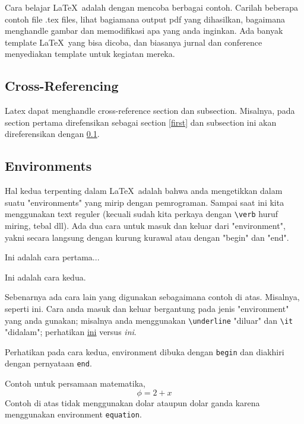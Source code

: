 \documentclass[12pt]{article}
\begin{document}
Cara belajar \LaTeX\ adalah dengan mencoba berbagai contoh. Carilah beberapa contoh file .tex files, lihat bagiamana output pdf yang dihasilkan, bagaimana menghandle gambar dan memodifikasi apa yang anda inginkan. Ada banyak template \LaTeX\ yang bisa dicoba, dan biasanya jurnal dan conference menyediakan template untuk kegiatan mereka.


\subsection{Cross-Referencing}
\label{subref}

Latex dapat menghandle cross-reference section dan subsection. Misalnya, pada section pertama direfensikan sebagai section \ref{first} dan subsection ini akan direferensikan dengan \ref{subref}.


\subsection{Environments}
\label{enviro}
Hal kedua terpenting dalam \LaTeX\ adalah bahwa anda mengetikkan dalam suatu "environments" yang mirip dengan pemrograman. 
Sampai saat ini kita menggunakan text reguler (kecuali sudah kita perkaya dengan  \verb|\verb| huruf miring, tebal dll).  Ada dua cara untuk masuk dan keluar dari "environment", yakni secara langsung dengan kurung kurawal atau dengan "begin" dan "end".
\vspace{1pc}

\centerline{Ini adalah cara pertama...}

\begin{center}
Ini adalah cara kedua.
\end{center}

\noindent Sebenarnya ada cara lain yang digunakan sebagaimana contoh di atas. Misalnya,
{\sc seperti ini}. Cara anda masuk dan keluar bergantung pada jenis "environment" yang anda gunakan; misalnya anda menggunakan \verb|\underline| "diluar" dan \verb|\it| "didalam"; 
perhatikan \underline{ini} versus {\it ini}.



Perhatikan pada cara kedua, environment dibuka dengan \texttt{begin} dan diakhiri dengan pernyataan \texttt{end}.

Contoh untuk persamaan matematika,
\begin{equation}
\phi=2+x
\end{equation}
Contoh di atas tidak menggunakan dolar ataupun dolar ganda karena menggunakan environment \texttt{equation}.
\end{document}
